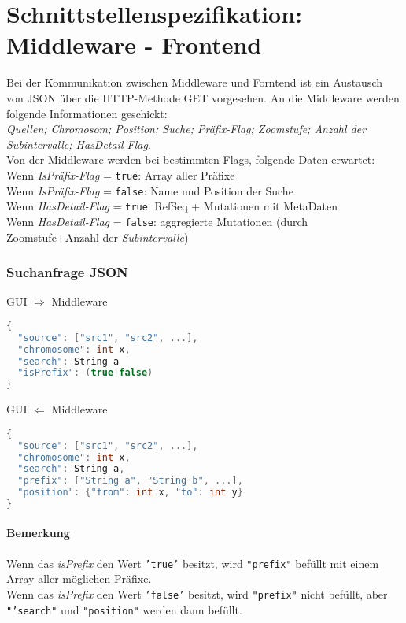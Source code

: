 \section{Schnittstellenspezifikation: Middleware - Frontend}
Bei der Kommunikation zwischen Middleware und Forntend ist ein Austausch von JSON über die HTTP-Methode GET vorgesehen.
An die Middleware werden folgende Informationen geschickt:
\\
\textit{Quellen; Chromosom; Position; Suche; Präfix-Flag; Zoomstufe; Anzahl der Subintervalle; HasDetail-Flag}.\\
Von der Middleware werden bei bestimmten Flags, folgende Daten erwartet:
\\
Wenn \textit{IsPräfix-Flag} = \texttt{true}: Array aller Präfixe\\
Wenn \textit{IsPräfix-Flag} = \texttt{false}: Name und Position der Suche\\[1em]
Wenn \textit{HasDetail-Flag} = \texttt{true}: RefSeq + Mutationen mit MetaDaten\\
Wenn \textit{HasDetail-Flag} = \texttt{false}: aggregierte Mutationen (durch Zoomstufe+Anzahl der \textit{Subintervalle})

\subsubsection{Suchanfrage JSON}
GUI $\Rightarrow$ Middleware
\begin{lstlisting}[language=c,
commentstyle=\fontsize{12}{14.4}\ttfamily,
basicstyle=\ttfamily\fontsize{10}{12}\selectfont, showstringspaces=false]
{
  "source": ["src1", "src2", ...],
  "chromosome": int x,
  "search": String a
  "isPrefix": (true|false)
}
\end{lstlisting}
GUI $\Leftarrow$ Middleware
\begin{lstlisting}[language=c,
commentstyle=\fontsize{12}{14.4}\ttfamily,
basicstyle=\ttfamily\fontsize{10}{12}\selectfont, showstringspaces=false]
{
  "source": ["src1", "src2", ...],
  "chromosome": int x,
  "search": String a,
  "prefix": ["String a", "String b", ...],
  "position": {"from": int x, "to": int y}
}
\end{lstlisting}
\paragraph{Bemerkung} Wenn das \textit{isPrefix} den Wert \texttt{'true'} besitzt, wird \texttt{"prefix"} befüllt mit einem Array aller möglichen Präfixe.\\
Wenn das \textit{isPrefix} den Wert \texttt{'false'} besitzt, wird \texttt{"prefix"} nicht befüllt, aber \texttt{"'search"} und \texttt{"position"} werden dann befüllt.
\newpage

